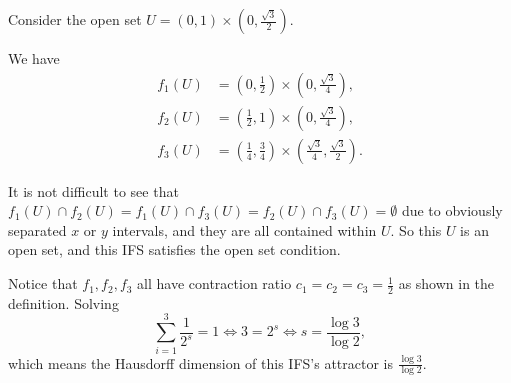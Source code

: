 Consider the open set \(U = (0,1) \times \left(0, \frac{\sqrt{3}}{2}\right).\)

We have
\begin{align*}
    f_1(U) &= \left(0, \frac{1}{2}\right) \times \left(0, \frac{\sqrt{3}}{4}\right),\\
    f_2(U) &= \left(\frac{1}{2}, 1\right) \times \left(0, \frac{\sqrt{3}}{4}\right),\\
    f_3(U) &= \left(\frac{1}{4}, \frac{3}{4}\right) \times \left(\frac{\sqrt{3}}{4}, \frac{\sqrt{3}}{2}\right).
\end{align*}

It is not difficult to see that \(f_1(U) \cap f_2(U) = f_1(U) \cap f_3(U) = f_2(U) \cap f_3(U) = \emptyset\) due to obviously separated \(x\) or \(y\) intervals, and they are all contained within \(U\). So this \(U\) is an open set, and this IFS satisfies the open set condition.

Notice that \(f_1, f_2, f_3\) all have contraction ratio \(c_1 = c_2 = c_3 = \frac{1}{2}\) as shown in the definition. Solving
\[
\sum_{i = 1}^{3} \frac{1}{2^s} = 1 \iff 3 = 2^s \iff s = \frac{\log 3}{\log 2},
\]
which means the Hausdorff dimension of this IFS's attractor is \(\frac{\log 3}{\log 2}\).